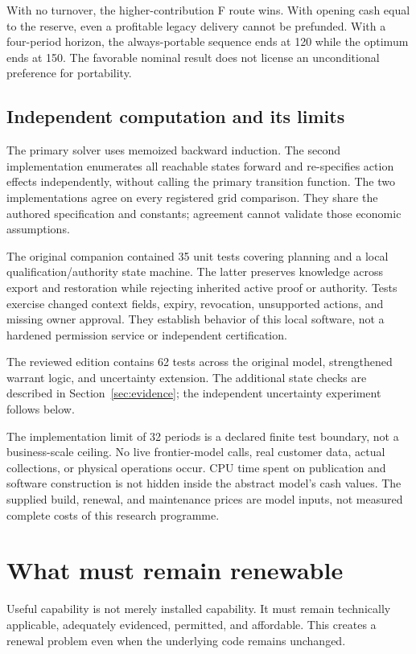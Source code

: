 With no turnover, the higher-contribution F route wins. With opening cash equal to the reserve, even a profitable legacy delivery cannot be prefunded. With a four-period horizon, the always-portable sequence ends at 120 while the optimum ends at 150. The favorable nominal result does not license an unconditional preference for portability.

\subsection{Independent computation and its limits}
The primary solver uses memoized backward induction. The second implementation enumerates all reachable states forward and re-specifies action effects independently, without calling the primary transition function. The two implementations agree on every registered grid comparison. They share the authored specification and constants; agreement cannot validate those economic assumptions.

The original companion contained 35 unit tests covering planning and a local qualification/authority state machine. The latter preserves knowledge across export and restoration while rejecting inherited active proof or authority. Tests exercise changed context fields, expiry, revocation, unsupported actions, and missing owner approval. They establish behavior of this local software, not a hardened permission service or independent certification.

The reviewed edition contains 62 tests across the original model, strengthened warrant logic, and uncertainty extension. The additional state checks are described in Section~\ref{sec:evidence}; the independent uncertainty experiment follows below.

The implementation limit of 32 periods is a declared finite test boundary, not a business-scale ceiling. No live frontier-model calls, real customer data, actual collections, or physical operations occur. CPU time spent on publication and software construction is not hidden inside the abstract model's cash values. The supplied build, renewal, and maintenance prices are model inputs, not measured complete costs of this research programme.



\section{What must remain renewable}
\label{sec:renewal}
Useful capability is not merely installed capability. It must remain technically applicable, adequately evidenced, permitted, and affordable. This creates a renewal problem even when the underlying code remains unchanged.

